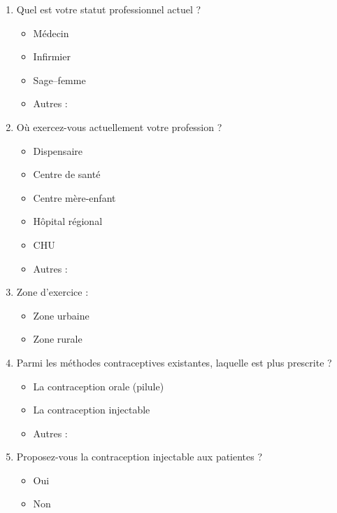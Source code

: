 \begin{enumerate}[label=\arabic*.]
  \item	Quel est votre statut professionnel actuel ? 
  \begin{itemize}[label=$\square$]
      \item Médecin
      \item Infirmier 
      \item Sage–femme  
      \item Autres : 
  \end{itemize}
  \vspace{2em}

  \item Où exercez-vous actuellement votre profession ? 
    \begin{itemize}[label=$\square$]
      \item Dispensaire 
      \item Centre de santé 
      \item Centre mère-enfant   
      \item Hôpital régional 
      \item CHU
      \item Autres : 
    \end{itemize}
    \vspace{2em}
  
  \item Zone d’exercice : 
    \begin{itemize}[label=$\square$]
      \item Zone urbaine 
      \item Zone rurale     
    \end{itemize}
    \vspace{2em}
  
  \item	Parmi les méthodes contraceptives existantes, laquelle est plus prescrite ? 
    \begin{itemize}[label=$\square$]
      \item La contraception orale (pilule)
      \item La contraception injectable 
      \item Autres : 
    \end{itemize}
    \vspace{2em}

  \item	Proposez-vous la contraception injectable aux patientes ? 
    \begin{itemize}[label=$\square$]
      \item Oui 
      \item Non 
    \end{itemize}
    \vspace{2em}


\end{enumerate}
